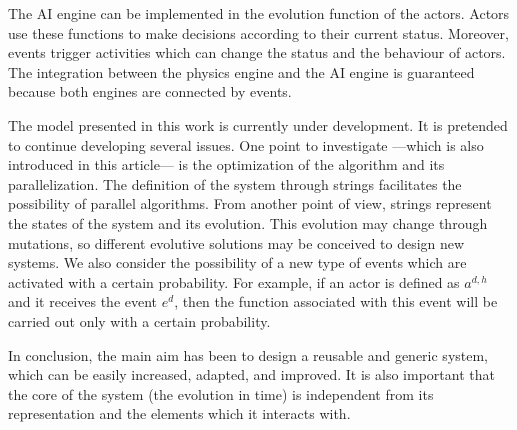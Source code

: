 \documentclass[12pt]{article}
\begin{document}
The AI engine can be implemented in the evolution function of the actors. Actors use these
functions to make decisions according to their current status. Moreover, events trigger activities
which can change the status and the behaviour of actors. The integration between the physics engine
and the AI engine is guaranteed because both engines are connected by events.

The model presented in this work is currently under development. It is pretended to continue
developing several issues. One point to investigate ---which is also introduced in this article---
is the optimization of the algorithm and its parallelization. The definition of the system through
strings facilitates the possibility of parallel algorithms. From another point of view, strings
represent the states of the system and its evolution. This evolution may change through mutations,
so different evolutive solutions may be conceived to design new systems. We also consider the
possibility of a new type of events which are activated with a certain probability. For example, if
an actor is defined as $a^{d,h}$ and it receives the event $e^d$, then the function associated with
this event will be carried out only with a certain probability.

In conclusion, the main aim has been to design a reusable and generic system, which can be easily
increased, adapted, and improved. It is also important that the core of the system (the evolution
in time) is independent from its representation and the elements which it interacts with.



\end{document}
